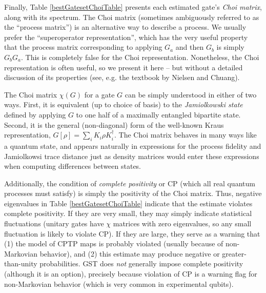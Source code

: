 \documentclass{article}[11pt]
\begin{document}


Finally, Table \ref{bestGatesetChoiTable} presents each estimated gate's \emph{Choi matrix}, along with its spectrum.  The Choi matrix (sometimes ambiguously referred to as the ``process matrix'') is an alternative way to describe a process.  We usually prefer the ``superoperator representation'', which has the very useful property that the process matrix corresponding to applying $G_a$ and then $G_b$ is simply $G_bG_a$.  This is completely false for the Choi representation.  Nonetheless, the Choi representation is often useful, so we present it here -- but without a detailed discussion of its properties (see, e.g. the textbook by Nielsen and Chuang).

The Choi matrix $\chi(G)$ for a gate $G$ can be simply understood in either of two ways.  First, it is equivalent (up to choice of basis) to the \emph{Jamiolkowski state} defined by applying $G$ to one half of a maximally entangled bipartite state.  Second, it is the general (non-diagonal) form of the well-known Kraus representation, $G[\rho] = \sum_i{K_i\rho K_i^\dagger}$.  The Choi matrix behaves in many ways like a quantum state, and appears naturally in expressions for the process fidelity and Jamiolkowsi trace distance just as density matrices would enter these expressions when computing differences between states.  

Additionally, the condition of \emph{complete positivity} or CP (which all real quantum processes must satisfy) is simply the positivity of the Choi matrix.  Thus, negative eigenvalues in Table \ref{bestGatesetChoiTable} indicate that the estimate violates complete positivity.  If they are very small, they may simply indicate statistical fluctuations (unitary gates have $\chi$ matrices with zero eigenvalues, so any small fluctuation is likely to violate CP).  If they are large, they serve as a warning that (1) the model of CPTP maps is probably violated (usually because of non-Markovian behavior), and (2) this estimate may produce negative or greater-than-unity probabilities.  GST does \emph{not} generally impose complete positivity (although it is an option), precisely because violation of CP is a warning flag for non-Markovian behavior (which is very common in experimental qubits).
\end{document}
